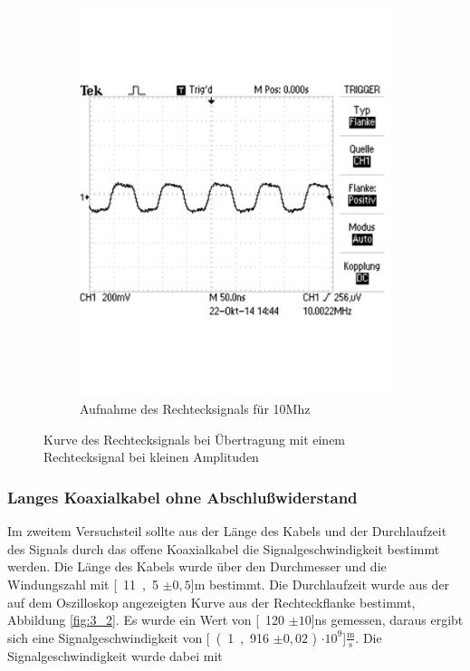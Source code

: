 \documentclass[12pt,a4paper]{article}
\begin{document}
\begin{figure}[H]
        ~ %
        \hfill
        \begin{subfigure}[tb]{0.48\textwidth}
                \includegraphics[width=\textwidth , scale = 0.4]{3_1_10mhz.pdf}
                \caption[Aufnahme des Rechtecksignals für 10Mhz]{Aufnahme des Rechtecksignals für 10Mhz}
  				\label{fig:3_1_mhz}
        \end{subfigure}
        \caption{Kurve des Rechtecksignals bei Übertragung mit einem Rechtecksignal bei kleinen Amplituden}
        \label{fig:3_1_vergleich}
\end{figure}



\subsubsection{Langes Koaxialkabel ohne Abschlußwiderstand}

Im zweitem Versuchsteil sollte aus der Länge des Kabels und der Durchlaufzeit des Signals durch das offene Koaxialkabel die Signalgeschwindigkeit bestimmt werden. Die Länge des Kabels wurde über den Durchmesser und die Windungszahl mit \unit[11,5 $\pm 0,5$]{m} bestimmt. Die Durchlaufzeit wurde aus der auf dem Oszilloskop angezeigten Kurve aus der Rechteckflanke bestimmt, Abbildung \ref{fig:3_2}. Es wurde ein Wert von \unit[120 $\pm10$]{ns} gemessen, daraus ergibt sich eine Signalgeschwindigkeit von \unit[(1,916 $\pm 0,02$ ) $\cdot 10^9$]{$\frac{\text{m}}{\text{s}}$}. Die Signalgeschwindigkeit wurde dabei mit 
\end{document}
